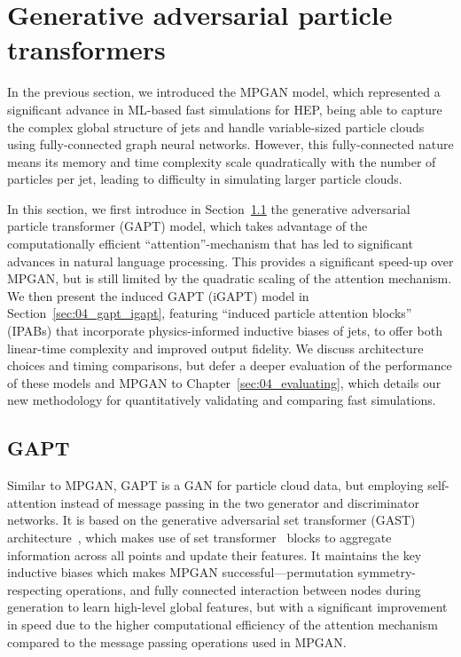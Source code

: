 \section{Generative adversarial particle transformers}
\label{sec:04_gapt}

In the previous section, we introduced the MPGAN model, which represented a significant advance in ML-based fast simulations for HEP, being able to capture the complex global structure of jets and handle variable-sized particle clouds using fully-connected graph neural networks.
However, this fully-connected nature means its memory and time complexity scale quadratically with the number of particles per jet, leading to difficulty in simulating larger particle clouds.

In this section, we first introduce in Section~\ref{sec:04_gapt_gapt} the generative adversarial particle transformer (GAPT) model, which takes advantage of the computationally efficient ``attention''-mechanism that has led to significant advances in natural language processing.
This provides a significant speed-up over MPGAN, but is still limited by the quadratic scaling of the attention mechanism.
We then present the induced GAPT (iGAPT) model in Section~\ref{sec:04_gapt_igapt}, featuring ``induced particle attention blocks'' (IPABs) that incorporate physics-informed inductive biases of jets, to offer both linear-time complexity and improved output fidelity.
We discuss architecture choices and timing comparisons, but defer a deeper evaluation of the performance of these models and MPGAN to Chapter~\ref{sec:04_evaluating}, which details our new methodology for quantitatively validating and comparing fast simulations.

\subsection{GAPT}
\label{sec:04_gapt_gapt}

Similar to MPGAN, GAPT is a GAN for particle cloud data, but employing self-attention instead of message passing in the two generator and discriminator networks.
It is based on the generative adversarial set transformer (GAST) architecture~\cite{stelzner2020generative}, which makes use of set transformer~\cite{lee2019set} blocks to aggregate information across all points and update their features.
It maintains the key inductive biases which makes MPGAN successful---permutation symmetry-respecting operations, and fully connected interaction between nodes during generation to learn high-level global features, but with a significant improvement in speed due to the higher computational efficiency of the attention mechanism compared to the message passing operations used in MPGAN.

